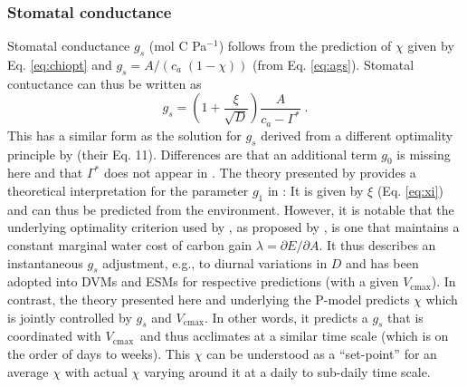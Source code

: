 \documentclass{myreport}
\newcommand{\vcmax}{$V_{\text{cmax}}$}
\begin{document}
\subsubsection{Stomatal conductance}
\label{sec:gs}
Stomatal conductance $g_s$ (mol C Pa$^{-1}$) follows from the prediction of $\chi$ given by Eq. \ref{eq:chiopt} and $g_s = A / ( c_a\;(1-\chi) )$ (from Eq. \ref{eq:ags}). Stomatal contuctance can thus be written as
\begin{equation}
\label{eq:gs}
    g_s = \left( 1 + \frac{\xi}{\sqrt{D}} \right) \frac{A}{c_a - \Gamma^\ast}\;.
\end{equation}
This has a similar form as the solution for $g_s$ derived from a different optimality principle by \citet{medlyn11gcb} (their Eq. 11). Differences are that an additional term $g_0$ is missing here and that $\Gamma^\ast$ does not appear in \citet{medlyn11gcb}. The theory presented by \citet{prentice14ecollett} provides a theoretical interpretation for the parameter $g_1$ in \citet{medlyn11gcb}: It is given by $\xi$ (Eq. \ref{eq:xi}) and can thus be predicted from the environment. However, it is notable that the underlying optimality criterion used by \citet{medlyn11gcb}, as proposed by \citet{Cowan1977-ud}, is one that maintains a constant marginal water cost of carbon gain $\lambda = \partial E / \partial A$. It thus describes an instantaneous $g_s$ adjustment, e.g., to diurnal variations in $D$ and has been adopted into DVMs and ESMs for respective predictions (with a given \vcmax ). In contrast, the theory presented here and underlying the P-model predicts $\chi$ which is jointly controlled by $g_s$ and \vcmax . In other words, it predicts a $g_s$ that is coordinated with \vcmax\ and thus acclimates at a similar time scale (which is on the order of days to weeks). This $\chi$ can be understood as a ``set-point'' for an average $\chi$ with actual $\chi$ varying around it at a daily to sub-daily time scale.

\end{document}
